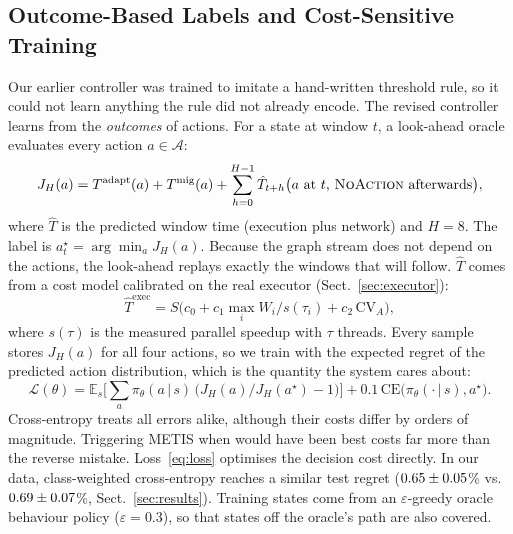 \subsection{Outcome-Based Labels and Cost-Sensitive Training}\label{sec:labels}
Our earlier controller was trained to imitate a hand-written threshold rule, so it could not
learn anything the rule did not already encode. The revised controller learns from the
\emph{outcomes} of actions. For a state at window $t$, a look-ahead oracle evaluates every
action $a\in\mathcal{A}$:
\begin{equation}\label{eq:oracle}
  J_H(a) = T^{\mathrm{adapt}}(a)+T^{\mathrm{mig}}(a) + \sum_{h=0}^{H-1} \hat T_{t+h}\big(\text{$a$ at $t$, \textsc{NoAction}{} afterwards}\big),
\end{equation}
where $\hat T$ is the predicted window time (execution plus network) and $H=8$. The label is
$a^\star_t=\arg\min_a J_H(a)$. Because the graph stream does not depend on the actions, the
look-ahead replays exactly the windows that will follow. $\hat T$ comes from a cost model
calibrated on the real executor (Sect.~\ref{sec:executor}):
\begin{equation}\label{eq:cost}
  \hat T^{\mathrm{exec}} = S\big(c_0 + c_1 \max_i W_i/s(\tau_i) + c_2\,\mathrm{CV}_A\big),
\end{equation}
where $s(\tau)$ is the measured parallel speedup with $\tau$ threads. Every sample stores
$J_H(a)$ for all four actions, so we train with the expected regret of the predicted action
distribution, which is the quantity the system cares about:
\begin{equation}\label{eq:loss}
  \mathcal{L}(\theta) = \mathbb{E}_{s}\Big[\textstyle\sum_{a} \pi_\theta(a\,|\,s)\,\big(J_H(a)/J_H(a^\star)-1\big)\Big]
  + 0.1\,\mathrm{CE}\big(\pi_\theta(\cdot\,|\,s), a^\star\big).
\end{equation}
Cross-entropy treats all errors alike, although their costs differ by orders of magnitude.
Triggering METIS when \NOA{} would have been best costs far more than the reverse mistake.
Loss~\eqref{eq:loss} optimises the decision cost directly. In our data, class-weighted
cross-entropy reaches a similar test regret ($0.65\pm0.05$\% vs.\
$0.69\pm0.07$\%, Sect.~\ref{sec:results}). Training states come from an $\varepsilon$-greedy oracle behaviour policy
($\varepsilon=0.3$), so that states off the oracle's path are also covered.

